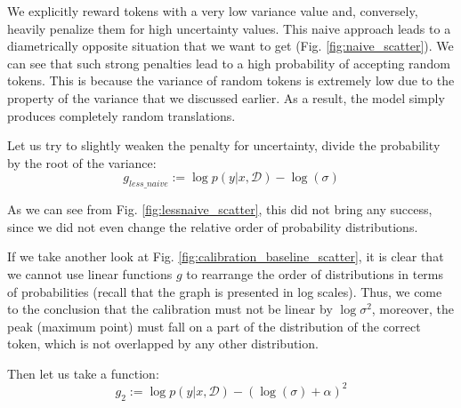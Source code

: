 \documentclass[a4paper,14pt]{extarticle}
\begin{document}
	We explicitly reward tokens with a very low variance value and, conversely, heavily penalize them for high uncertainty values. This naive approach leads to a diametrically opposite situation that we want to get (Fig. \ref{fig:naive_scatter}). We can see that such strong penalties lead to a high probability of accepting random tokens. This is because the variance of random tokens is extremely low due to the property of the variance that we discussed earlier. As a result, the model simply produces completely random translations.

	
	Let us try to slightly weaken the penalty for uncertainty, divide the probability by the root of the variance:
	\begin{equation}
		g_{less\_naive} := \log p(y | x, \mathcal{D}) - \log(\sigma)
	\end{equation}
	
	As we can see from Fig. \ref{fig:lessnaive_scatter}, this did not bring any success, since we did not even change the relative order of probability distributions.

	If we take another look at Fig. \ref{fig:calibration_baseline_scatter}, it is clear that we cannot use linear functions $g$ to rearrange the order of distributions in terms of probabilities (recall that the graph is presented in log scales). Thus, we come to the conclusion that the calibration must not be linear by $\log \sigma^2$, moreover, the peak (maximum point) must fall on a part of the distribution of the correct token, which is not overlapped by any other distribution.

	Then let us take a function:
	\begin{equation}
		g_{2} := \log p(y | x, \mathcal{D}) - (\log(\sigma) + \alpha)^2
	\end{equation}
	
\end{document}

